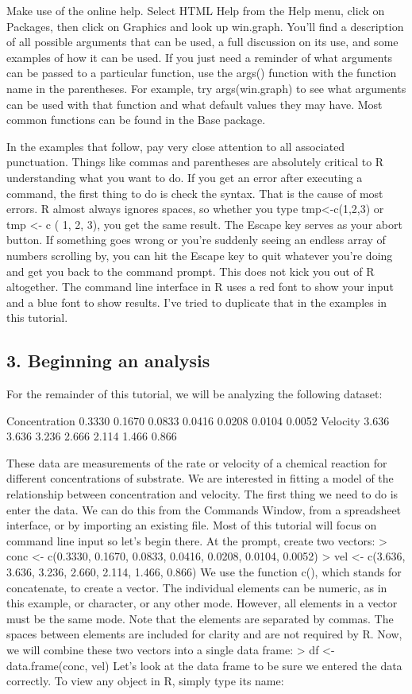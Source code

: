 {Make use of the online help. Select HTML Help from the Help menu, click on Packages, then click on Graphics and look up win.graph. You'll find a description of all possible arguments that can be used, a full discussion on its use, and some examples of how it can be used. If you just need a reminder of what arguments can be passed to a particular function, use the args() function with the function name in the parentheses. For example, try args(win.graph) to see what arguments can be used with that function and what default values they may have. Most common functions can be found in the Base package. 

In the examples that follow, pay very close attention to all associated punctuation. Things like commas and parentheses are absolutely critical to R understanding what you want to do. If you get an error after executing a command, the first thing to do is check the syntax. That is the cause of most errors. R almost always ignores spaces, so whether you type tmp<-c(1,2,3) or tmp <- c ( 1, 2, 3), you get the same result. 
The Escape key serves as your abort button. If something goes wrong or you're suddenly seeing an endless array of numbers scrolling by, you can hit the Escape key to quit whatever you're doing and get you back to the command prompt. This does not kick you out of R altogether. 
The command line interface in R uses a red font to show your input and a blue font to show results. I've tried to duplicate that in the examples in this tutorial. 

\subsection*{3. Beginning an analysis}


For the remainder of this tutorial, we will be analyzing the following dataset: 

Concentration
0.3330
0.1670
0.0833
0.0416
0.0208
0.0104
0.0052
Velocity
3.636
3.636
3.236
2.666
2.114
1.466
0.866

These data are measurements of the rate or velocity of a chemical reaction for different concentrations of substrate. We are interested in fitting a model of the relationship between concentration and velocity. The first thing we need to do is enter the data. We can do this from the Commands Window, from a spreadsheet interface, or by importing an existing file. Most of this tutorial will focus on command line input so let's begin there. At the prompt, create two vectors: 
> conc <- c(0.3330, 0.1670, 0.0833, 0.0416, 0.0208, 0.0104, 0.0052)
> vel <- c(3.636, 3.636, 3.236, 2.660, 2.114, 1.466, 0.866)
We use the function c(), which stands for concatenate, to create a vector. The individual elements can be numeric, as in this example, or character, or any other mode. However, all elements in a vector must be the same mode. Note that the elements are separated by commas. The spaces between elements are included for clarity and are not required by R. 
Now, we will combine these two vectors into a single data frame: 
> df <- data.frame(conc, vel)
Let's look at the data frame to be sure we entered the data correctly. To view any object in R, simply type its name: 

}
